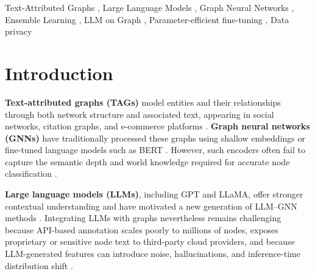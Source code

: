 \documentclass[a4paper,fleqn]{cas-sc}
\begin{document}
\begin{keywords}
Text-Attributed Graphs \sep
Large Language Models \sep
Graph Neural Networks \sep
Ensemble Learning \sep
LLM on Graph \sep
Parameter-efficient fine-tuning \sep
Data privacy

\end{keywords}


\maketitle

\section{Introduction}

\textbf{Text-attributed graphs (TAGs)} model entities and their relationships through both network structure and associated text, appearing in social networks, citation graphs, and e-commerce platforms \citep{zhang2025leveraging, he2024harnessing}. \textbf{Graph neural networks (GNNs)} have traditionally processed these graphs using shallow embeddings or fine-tuned language models such as BERT \citep{devlin2018bert}. However, such encoders often fail to capture the semantic depth and world knowledge required for accurate node classification \citep{he2024harnessing, zhang2025leveraging}.

\textbf{Large language models (LLMs)}, including GPT and LLaMA, offer stronger contextual understanding and have motivated a new generation of LLM--GNN methods \citep{brown2020language, touvron2023llama}. Integrating LLMs with graphs nevertheless remains challenging because API-based annotation scales poorly to millions of nodes, exposes proprietary or sensitive node text to third-party cloud providers, and because LLM-generated features can introduce noise, hallucinations, and inference-time distribution shift \citep{Jaiswal2024AllAgainstSome, hu2025gaga, zhang2025leveraging}.
\end{document}
